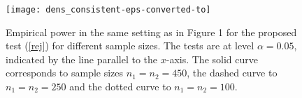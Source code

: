 \documentclass[lineno]{biometrika}
\def\F{Fr\'{e}chet}
\begin{document}
\begin{figure}
	\centering
		\texttt{[image: dens\_consistent-eps-converted-to]}
		\caption{Empirical power in the same setting as in Figure 1 for the proposed test (\ref{rej}) for different sample sizes. %
		The tests are at level $\alpha=0.05$, indicated by the line parallel to the $x$-axis. The  solid curve corresponds %
		to sample sizes	$n_1=n_2=450$, the dashed curve to  $n_1=n_2=250$ and the dotted curve to  $n_1=n_2=100$.}
		\label{fig: fig_2}
\end{figure}
\end{document}
